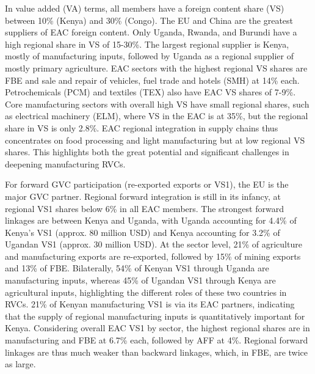 \documentclass[a4paper]{article}
\begin{document}
In value added (VA) terms, all members have a foreign content share (VS) between 10\% (Kenya) and 30\% (Congo). The EU and China are the greatest suppliers of EAC foreign content. Only Uganda, Rwanda, and Burundi have a high regional share in VS of 15-30\%. The largest regional supplier is Kenya, mostly of manufacturing inputs, followed by Uganda as a regional supplier of mostly primary agriculture. EAC sectors with the highest regional VS shares are FBE and sale and repair of vehicles, fuel trade and hotels (SMH) at 14\% each. Petrochemicals (PCM) and textiles (TEX) also have EAC VS shares of 7-9\%. Core manufacturing sectors with overall high VS have small regional shares, such as electrical machinery (ELM), where VS in the EAC is at 35\%, but the regional share in VS is only 2.8\%. EAC regional integration in supply chains thus concentrates on food processing and light manufacturing but at low regional VS shares. This highlights both the great potential and significant challenges in deepening manufacturing RVCs.  \newline

For forward GVC participation (re-exported exports or VS1), the EU is the major GVC partner. Regional forward integration is still in its infancy, at regional VS1 shares below 6\% in all EAC members. The strongest forward linkages are between Kenya and Uganda, with Uganda accounting for 4.4\% of Kenya's VS1 (approx. 80 million USD) and Kenya accounting for 3.2\% of Ugandan VS1 (approx. 30 million USD). At the sector level, 21\% of agriculture and manufacturing exports are re-exported, followed by 15\% of mining exports and 13\% of FBE. Bilaterally, 54\% of Kenyan VS1 through Uganda are manufacturing inputs, whereas 45\% of Ugandan VS1 through Kenya are agricultural inputs, highlighting the different roles of these two countries in RVCs. 21\% of Kenyan manufacturing VS1 is via its EAC partners, indicating that the supply of regional manufacturing inputs is quantitatively important for Kenya. Considering overall EAC VS1 by sector, the highest regional shares are in manufacturing and FBE at 6.7\% each, followed by AFF at 4\%. Regional forward linkages are thus much weaker than backward linkages, which, in FBE, are twice as large. \newline
\end{document}
